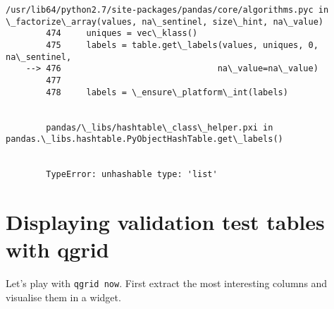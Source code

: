 \documentclass[11pt]{article}
\begin{document}
\begin{Verbatim}[commandchars=\\\{\}]
        /usr/lib64/python2.7/site-packages/pandas/core/algorithms.pyc in \_factorize\_array(values, na\_sentinel, size\_hint, na\_value)
        474     uniques = vec\_klass()
        475     labels = table.get\_labels(values, uniques, 0, na\_sentinel,
    --> 476                               na\_value=na\_value)
        477 
        478     labels = \_ensure\_platform\_int(labels)


        pandas/\_libs/hashtable\_class\_helper.pxi in pandas.\_libs.hashtable.PyObjectHashTable.get\_labels()


        TypeError: unhashable type: 'list'

    \end{Verbatim}

    \hypertarget{displaying-validation-test-tables-with-qgrid}{%
\section{Displaying validation test tables with
qgrid}\label{displaying-validation-test-tables-with-qgrid}}

Let's play with \texttt{qgrid\ now}. First extract the most interesting
columns and visualise them in a widget.
\end{document}
